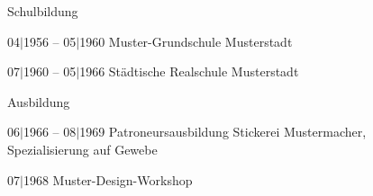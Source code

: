 \documentclass[german]{alpication}
\begin{document}
{	%

}{%

	\begin{cvsection}{Schulbildung}
		\item [04$\vert$1956 -- 05$\vert$1960] 	Muster-Grundschule Musterstadt
		\item [07$\vert$1960 -- 05$\vert$1966] 	Städtische Realschule Musterstadt
	\end{cvsection}

	\begin{cvsection}{Ausbildung}
		\item [06$\vert$1966 -- 08$\vert$1969] 	Patroneursausbildung Stickerei Mustermacher,\\Spezialisierung auf Gewebe
		\item [07$\vert$1968]			Muster-Design-Workshop
	\end{cvsection}

} %


% 
% 
\end{document}
